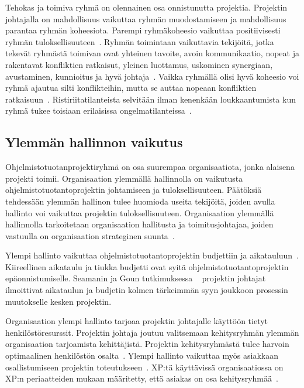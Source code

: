 \documentclass[finnish]{tktltiki2}
\theoremstyle{definition}
\theoremstyle{remark}
\begin{document}
Tehokas ja toimiva ryhmä on olennainen osa onnistunutta projektia. Projektin johtajalla on mahdollisuus vaikuttaa ryhmän muodostamiseen ja mahdollisuus parantaa ryhmän koheesiota. Parempi ryhmäkoheesio vaikuttaa positiivisesti ryhmän tuloksellisuuteen~\cite{bahli2005group, McLeod:2011:FAS:1978802.1978803}. Ryhmän toimintaan vaikuttavia tekijöitä, jotka tekevät ryhmästä toimivan ovat yhteinen tavoite, avoin kommunikaatio, nopeat ja rakentavat konfliktien ratkaisut, yleinen luottamus, uskominen synergiaan, avustaminen, kunnioitus ja hyvä johtaja~\cite{4017705}. Vaikka ryhmällä olisi hyvä koheesio voi ryhmä ajautua silti konflikteihin, mutta se auttaa nopeaan konfliktien ratkaisuun~\cite{bradley1997effect}. Ristiriitatilanteista selvitään ilman kenenkään loukkaantumista kun ryhmä tukee toisiaan erilaisissa ongelmatilanteissa~\cite{bradley1997effect}.







\subsection{Ylemmän hallinnon vaikutus}

Ohjelmistotuotanprojektiryhmä on osa suurempaa organisaatiota, jonka alaisena projekti toimii. Organisaation ylemmällä hallinnolla on vaikutusta ohjelmistotuotantoprojektin johtamiseen ja tuloksellisuuteen. Päätöksiä tehdessään ylemmän hallinon tulee huomioda useita tekijöitä, joiden avulla hallinto voi vaikuttaa projektin tuloksellisuuteen.  Organisaation ylemmällä hallinnolla tarkoitetaan organisaation hallitusta ja toimitusjohtajaa, joiden vastuulla on organisaation strateginen suunta~\cite{McLeod:2011:FAS:1978802.1978803}.

Ylempi hallinto vaikuttaa ohjelmistotuotantoprojektin budjettiin ja aikatauluun~\cite{McLeod:2011:FAS:1978802.1978803}. Kiireellinen aikataulu ja tiukka budjetti ovat syitä ohjelmistotuotantoprojektin epäonnistumiselle. Seamanin ja Goun tutkimuksessa ~\cite{Guo:2008:SSP:1414004.1414046} projektin johtajat ilmoittivat aikataulun ja budjetin kolmen tärkeimmän syyn joukkoon prosessin muutokselle kesken projektin.

Organisaation ylempi hallinto tarjoaa projektin johtajalle käyttöön tietyt henkilöstöresurssit. Projektin johtaja joutuu valitsemaan kehitysryhmän ylemmän organisaation tarjoamista kehittäjistä. Projektin kehitysryhmästä tulee harvoin optimaalinen henkilöstön osalta~\cite{Dhomne:2012:ITL:2382887.2382899}. Ylempi hallinto vaikuttaa myös asiakkaan osallistumiseen projektin toteutukseen~\cite{McLeod:2011:FAS:1978802.1978803}. XP:tä käyttävissä organisaatiossa on XP:n periaatteiden mukaan määritetty, että asiakas on osa kehitysryhmää~\cite{796139}.
\end{document}
